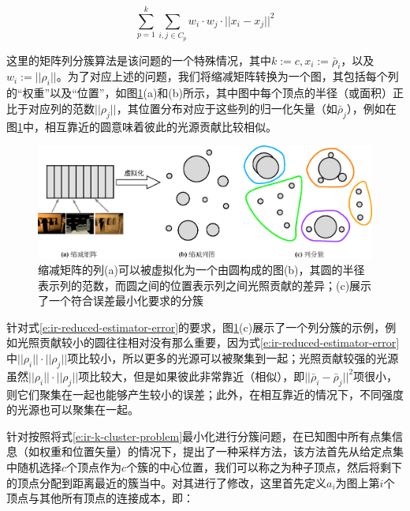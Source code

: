 \begin{equation}\label{e:ir-k-cluster-problem}
	\sum^{k}_{p=1}\sum_{i,j\in C_p}w_i\cdot w_j\cdot||x_i-x_j||^{2}
\end{equation}

\noindent 这里的矩阵列分簇算法是该问题的一个特殊情况，其中$k:=c,x_i:=\bar{\rho}_i$，以及$w_i:=||\rho_i||$。为了对应上述的问题，我们将缩减矩阵转换为一个图，其包括每个列的“权重”以及“位置”，如图\ref{f:ir-reduced-columns}(a)和(b)所示，其中图中每个顶点的半径（或面积）正比于对应列的范数$||\rho_j||$，其位置分布对应于这些列的归一化矢量（如$\bar{\rho}_j$），例如在图\ref{f:ir-reduced-columns}中，相互靠近的圆意味着彼此的光源贡献比较相似。

\begin{figure}
	\includegraphics[width=1.0\textwidth]{figures/ir/reduced-columns}
	\caption{缩减矩阵的列(a)可以被虚拟化为一个由圆构成的图(b)，其圆的半径表示列的范数，而圆之间的位置表示列之间光照贡献的差异；(c)展示了一个符合误差最小化要求的分簇}
	\label{f:ir-reduced-columns}
\end{figure}

针对式\ref{e:ir-reduced-estimator-error}的要求，图\ref{f:ir-reduced-columns}(c)展示了一个列分簇的示例，例如光照贡献较小的圆往往相对没有那么重要，因为式\ref{e:ir-reduced-estimator-error}中$||\rho_i||\cdot||\rho_j||$项比较小，所以更多的光源可以被聚集到一起；光照贡献较强的光源虽然$||\rho_i||\cdot||\rho_j||$项比较大，但是如果彼此非常靠近（相似），即$||\bar{\rho}_i-\bar{\rho}_j||^{2}$项很小，则它们聚集在一起也能够产生较小的误差；此外，在相互靠近的情况下，不同强度的光源也可以聚集在一起。

针对按照将式\ref{e:ir-k-cluster-problem}最小化进行分簇问题，在已知图中所有点集信息（如权重和位置矢量）的情况下，\cite{a:ClusteredDeferredandForwardShading}提出了一种采样方法，该方法首先从给定点集中随机选择$c$个顶点作为$c$个簇的中心位置，我们可以称之为种子顶点，然后将剩下的顶点分配到距离最近的簇当中。\cite{a:MatrixRow-ColumnSamplingfortheMany-LightProblem}对其进行了修改，这里首先定义$a_i$为图上第$i$个顶点与其他所有顶点的连接成本，即：

